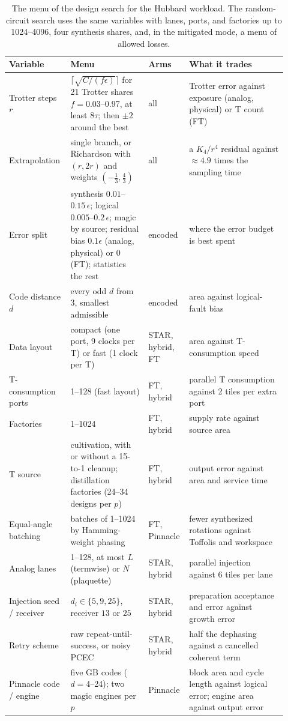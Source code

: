 \documentclass[11pt]{article}
\newcommand{\eps}{\epsilon}
\begin{document}
\begin{table}[!htbp]
\centering
\small
\begin{tabular}{@{}p{0.2\linewidth}p{0.27\linewidth}p{0.11\linewidth}p{0.34\linewidth}@{}}
\toprule
Variable & Menu & Arms & What it trades\\
\midrule
Trotter steps $r$ & $\lceil\sqrt{C/(f\eps)}\rceil$ for 21 Trotter shares $f=0.03$--0.97, at least $8\tau$; then $\pm2$ around the best & all & Trotter error against exposure (analog, physical) or T count (FT)\\
Extrapolation & single branch, or Richardson with $(r,2r)$ and weights $(-\tfrac13,\tfrac43)$ & all & a $K_4/r^4$ residual against $\approx4.9$ times the sampling time\\
Error split & synthesis $0.01$--$0.15\,\eps$; logical $0.005$--$0.2\,\eps$; magic by source; residual bias $0.1\eps$ (analog, physical) or 0 (FT); statistics the rest & encoded & where the error budget is best spent\\
Code distance $d$ & every odd $d$ from 3, smallest admissible & encoded & area against logical-fault bias\\
Data layout & compact (one port, 9 clocks per T) or fast (1 clock per T) & STAR, hybrid, FT & area against T-consumption speed\\
T-consumption ports & 1--128 (fast layout) & FT, hybrid & parallel T consumption against 2 tiles per extra port\\
Factories & 1--1024 & FT, hybrid & supply rate against source area\\
T source & cultivation, with or without a 15-to-1 cleanup; distillation factories (24--34 designs per $p$) & FT, hybrid & output error against area and service time\\
Equal-angle batching & batches of 1--1024 by Hamming-weight phasing & FT, Pinnacle & fewer synthesized rotations against Toffolis and workspace\\
Analog lanes & 1--128, at most $L$ (termwise) or $N$ (plaquette) & STAR, hybrid & parallel injection against 6 tiles per lane\\
Injection seed / receiver & $d_i\in\{5,9,25\}$, receiver $13$ or $25$ & STAR, hybrid & preparation acceptance and error against growth error\\
Retry scheme & raw repeat-until-success, or noisy PCEC & STAR, hybrid & half the dephasing against a cancelled coherent term\\
Pinnacle code / engine & five GB codes ($d=4$--24); two magic engines per $p$ & Pinnacle & block area and cycle length against logical error; engine area against output error\\
\bottomrule
\end{tabular}
\caption{The menu of the design search for the Hubbard workload. The random-circuit
search uses the same variables with lanes, ports, and factories up to 1024--4096,
four synthesis shares, and, in the mitigated mode, a menu of allowed losses.}\label{tab:search-menu}
\end{table}
\end{document}
